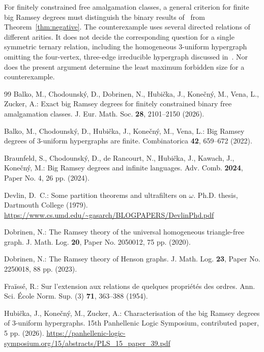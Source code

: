 \documentclass{article}
\numberwithin{equation}{section}
\theoremstyle{definition}
\begin{document}
For finitely constrained free amalgamation classes, a general criterion
for finite big Ramsey degrees must distinguish the binary results
of~\cite{ZuckerBinary,BinaryExact} from Theorem~\ref{thm:negative}.
The counterexample uses several directed relations of different arities.
It does not decide the corresponding question for a single symmetric
ternary relation, including the homogeneous $3$-uniform hypergraph
omitting the four-vertex, three-edge irreducible hypergraph discussed
in~\cite{TernaryDiaries}. Nor does the present argument determine the
least maximum forbidden size for a counterexample.
\begin{thebibliography}{99}
Balko, M., Chodounsk\'y, D., Dobrinen, N., Hubi\v cka, J., Kone\v cn\'y, M.,
Vena, L., Zucker, A.: Exact big Ramsey degrees for finitely constrained
binary free amalgamation classes.
J. Eur. Math. Soc. \textbf{28}, 2101--2150 (2026).

Balko, M., Chodounsk\'y, D., Hubi\v cka, J., Kone\v cn\'y, M., Vena, L.:
Big Ramsey degrees of $3$-uniform hypergraphs are finite.
Combinatorica \textbf{42}, 659--672 (2022).

Braunfeld, S., Chodounsk\'y, D., de Rancourt, N., Hubi\v cka, J., Kawach, J.,
Kone\v cn\'y, M.: Big Ramsey degrees and infinite languages.
Adv. Comb. \textbf{2024}, Paper No. 4, 26 pp. (2024).

Devlin, D.~C.: Some partition theorems and ultrafilters on $\omega$.
Ph.D. thesis, Dartmouth College (1979).
\url{https://www.cs.umd.edu/~gasarch/BLOGPAPERS/DevlinPhd.pdf}

Dobrinen, N.: The Ramsey theory of the universal homogeneous triangle-free
graph. J. Math. Log. \textbf{20}, Paper No. 2050012, 75 pp. (2020).

Dobrinen, N.: The Ramsey theory of Henson graphs.
J. Math. Log. \textbf{23}, Paper No. 2250018, 88 pp. (2023).

Fra\"iss\'e, R.: Sur l'extension aux relations de quelques propri\'et\'es
des ordres. Ann. Sci. \'Ecole Norm. Sup. (3) \textbf{71}, 363--388 (1954).

Hubi\v cka, J., Kone\v cn\'y, M., Zucker, A.: Characterisation of the big
Ramsey degrees of $3$-uniform hypergraphs.
15th Panhellenic Logic Symposium, contributed paper, 5 pp. (2026).
\url{https://panhellenic-logic-symposium.org/15/abstracts/PLS_15_paper_39.pdf}


\end{thebibliography}
\end{document}
